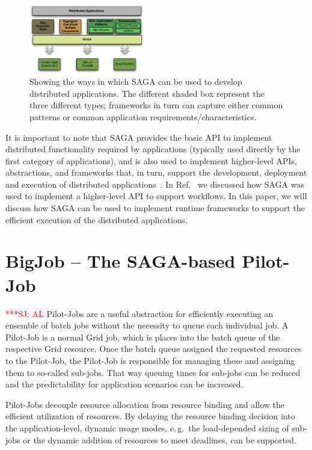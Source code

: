 \documentclass[conference,final]{IEEEtran}
\newcommand{\jhanote}[1]{ {\textcolor{red} { ***SJ: #1 }}}
\newcommand{\jhanote}[1]{}
\begin{document}
\begin{figure}[!ht]
  \begin{center}
    \includegraphics[width=0.45\textwidth]{distributed_applications_saga_figure.pdf}
  \end{center}
  \caption{\small Showing the ways in which SAGA can be used to
    develop distributed applications.  The different shaded box
    represent the three different types; frameworks in turn can
    capture either common patterns or common application
    requirements/characteristics. \label{Fig:sagaapps} }
\end{figure}

It is important to note that SAGA provides the basic API to
implement distributed functionality required by applications
(typically used directly by the first category of applications),
and is also used to implement higher-level APIs, abstractions, and
frameworks that, in turn, support the development, deployment and
execution of distributed
applications~\cite{gmac09,saga_data_intensive_abstractions}. In
Ref.~\cite{sagamontage09} we discussed how SAGA was used to
implement a higher-level API to support workflows. In this paper, 
we will discuss how SAGA can be used to implement runtime
frameworks to support the efficient execution of the distributed
applications.


\section{BigJob -- The SAGA-based Pilot-Job} \jhanote{AL}
Pilot-Jobs are a useful abstraction for efficiently executing an
ensemble of batch jobs without the necessity to queue each individual
job. A Pilot-Job is a normal Grid job, which is places into the batch
queue of the respective Grid resource. Once the batch queue assigned
the requested resources to the Pilot-Job, the Pilot-Job is responsible
for managing these and assigning them to so-called sub-jobs.  That way
queuing times for sub-jobs can be reduced and the predictability for
application scenarios can be increased.


Pilot-Jobs decouple resource allocation from resource binding and
allow the efficient utilization of resources. By delaying the resource
binding decision into the application-level, dynamic usage modes,
e.\,g.\ the load-depended sizing of sub-jobs or the dynamic addition
of resources to meet deadlines, can be supported.
\end{document}
